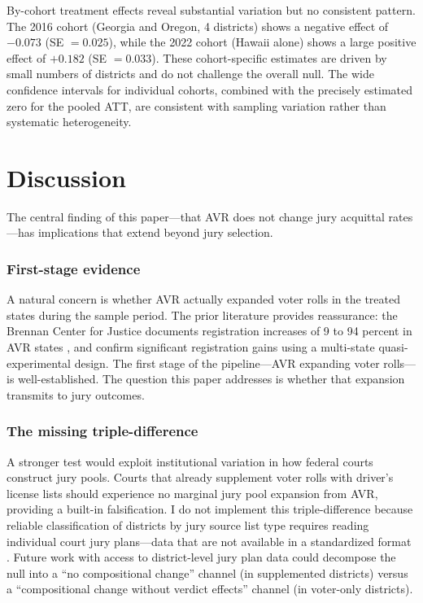 \documentclass[12pt]{article}
\begin{document}
By-cohort treatment effects reveal substantial variation but no consistent pattern. The 2016 cohort (Georgia and Oregon, 4 districts) shows a negative effect of $-0.073$ (SE $= 0.025$), while the 2022 cohort (Hawaii alone) shows a large positive effect of $+0.182$ (SE $= 0.033$). These cohort-specific estimates are driven by small numbers of districts and do not challenge the overall null. The wide confidence intervals for individual cohorts, combined with the precisely estimated zero for the pooled ATT, are consistent with sampling variation rather than systematic heterogeneity.

\section{Discussion}

The central finding of this paper---that AVR does not change jury acquittal rates---has implications that extend beyond jury selection.

\subsubsection*{First-stage evidence} A natural concern is whether AVR actually expanded voter rolls in the treated states during the sample period. The prior literature provides reassurance: the Brennan Center for Justice documents registration increases of 9 to 94 percent in AVR states \citep{brennan2023avr}, and \citet{griffin2023does} confirm significant registration gains using a multi-state quasi-experimental design. The first stage of the pipeline---AVR expanding voter rolls---is well-established. The question this paper addresses is whether that expansion transmits to jury outcomes.

\subsubsection*{The missing triple-difference} A stronger test would exploit institutional variation in how federal courts construct jury pools. Courts that already supplement voter rolls with driver's license lists should experience no marginal jury pool expansion from AVR, providing a built-in falsification. I do not implement this triple-difference because reliable classification of districts by jury source list type requires reading individual court jury plans---data that are not available in a standardized format \citep{herron2018jury}. Future work with access to district-level jury plan data could decompose the null into a ``no compositional change'' channel (in supplemented districts) versus a ``compositional change without verdict effects'' channel (in voter-only districts).
\end{document}
